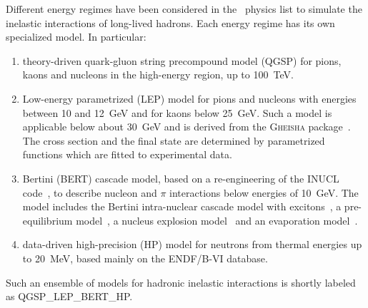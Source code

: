 \documentclass[article]{IEEEtran}
\begin{document}
Different energy regimes have been 
considered in the \MaGe\ physics list to simulate the inelastic interactions of long-lived 
hadrons. Each energy regime has its own specialized model. 
In particular:
\begin{enumerate}
\item theory-driven quark-gluon string precompound model (QGSP) for pions, kaons 
and nucleons in the high-energy region, up to 100~TeV.
\item Low-energy parametrized (LEP) model for pions and nucleons with energies between 10 and 
12~GeV and for kaons below 25~GeV. Such a model is applicable below about 30~GeV and is 
derived from the \textsc{Gheisha} package~\cite{gheisha}. The cross section and the final state are 
determined by parametrized functions which are fitted to experimental data.
\item Bertini (BERT) cascade model, based on a re-engineering of the 
\textsc{INUCL} code~\cite{inucl}, to describe nucleon and $\pi$ interactions below energies of 10~GeV.
The model includes the Bertini intra-nuclear cascade model with 
excitons~\cite{bert1, bert2}, a pre-equilibrium model~\cite{gri1,gri2}, a nucleus explosion 
model~\cite{breakup} and an evaporation model~\cite{weiss}. 
\item data-driven high-precision (HP) model for neutrons from thermal energies up to 20~MeV, 
based mainly on the ENDF/B-VI database.
\end{enumerate}
Such an ensemble of models for hadronic inelastic interactions is shortly labeled as 
QGSP\_LEP\_BERT\_HP.\\
\end{document}

